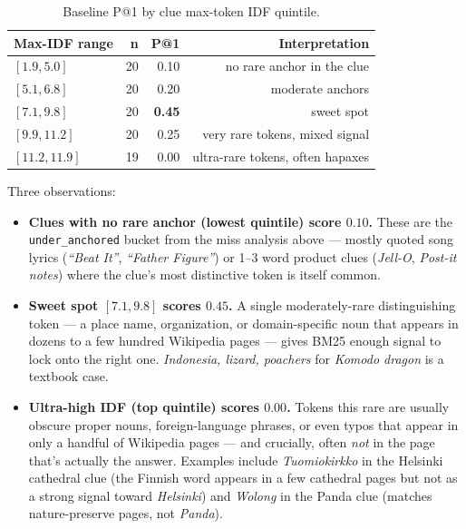 \documentclass[11pt]{article}
\begin{document}
\begin{table}[h]
\centering
\begin{tabular}{lrrr}
\toprule
\textbf{Max-IDF range} & \textbf{n} & \textbf{P@1} & \textbf{Interpretation} \\
\midrule
$[1.9, 5.0]$  & 20 & 0.10 & no rare anchor in the clue        \\
$[5.1, 6.8]$  & 20 & 0.20 & moderate anchors                  \\
$[7.1, 9.8]$  & 20 & \textbf{0.45} & sweet spot          \\
$[9.9, 11.2]$ & 20 & 0.25 & very rare tokens, mixed signal    \\
$[11.2, 11.9]$ & 19 & 0.00 & ultra-rare tokens, often hapaxes  \\
\bottomrule
\end{tabular}
\caption{Baseline P@1 by clue max-token IDF quintile.}
\end{table}

Three observations:

\begin{itemize}
  \item \textbf{Clues with no rare anchor (lowest quintile) score
        $0.10$.} These are the \texttt{under\_anchored} bucket from the
        miss analysis above --- mostly quoted song lyrics
        (\emph{``Beat It''}, \emph{``Father Figure''}) or 1--3 word
        product clues (\emph{Jell-O}, \emph{Post-it notes}) where the
        clue's most distinctive token is itself common.
  \item \textbf{Sweet spot $[7.1, 9.8]$ scores $0.45$.} A single
        moderately-rare distinguishing token --- a place name,
        organization, or domain-specific noun that appears in dozens to
        a few hundred Wikipedia pages --- gives BM25 enough signal to
        lock onto the right one. \emph{Indonesia, lizard, poachers}
        for \emph{Komodo dragon} is a textbook case.
  \item \textbf{Ultra-high IDF (top quintile) scores $0.00$.} Tokens
        this rare are usually obscure proper nouns, foreign-language
        phrases, or even typos that appear in only a handful of
        Wikipedia pages --- and crucially, often \emph{not} in the page
        that's actually the answer. Examples include \emph{Tuomiokirkko}
        in the Helsinki cathedral clue (the Finnish word appears in a
        few cathedral pages but not as a strong signal toward
        \emph{Helsinki}) and \emph{Wolong} in the Panda clue (matches
        nature-preserve pages, not \emph{Panda}).
\end{itemize}
\end{document}
